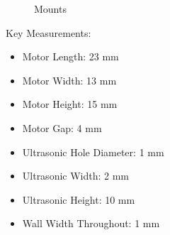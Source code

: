 \documentclass{article}
\begin{document}
	
	\begin{figure}[h!]
		\centering
		\hfill
		\hfill
		\hfill
		\hfill
		\hfill
		\caption{Mounts}
		\label{fig:mounted}
	\end{figure}
	
	
	
	Key Measurements:
	\begin{itemize}
		\item Motor Length: 23 mm
		\item Motor Width: 13 mm
		\item Motor Height: 15 mm
		\item Motor Gap: 4 mm
		\item Ultrasonic Hole Diameter: 1 mm
		\item Ultrasonic Width: 2 mm
		\item Ultrasonic Height: 10 mm
		\item Wall Width Throughout: 1 mm
	\end{itemize}
	
\end{document}
